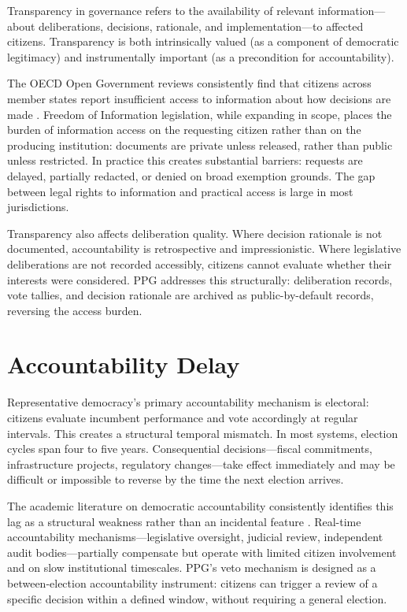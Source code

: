 \documentclass[12pt,a4paper,oneside]{report}
\begin{document}
Transparency in governance refers to the availability of relevant information---about deliberations, decisions, rationale, and implementation---to affected citizens. Transparency is both intrinsically valued (as a component of democratic legitimacy) and instrumentally important (as a precondition for accountability).

The OECD Open Government reviews consistently find that citizens across member states report insufficient access to information about how decisions are made \citep{oecd2020open}. Freedom of Information legislation, while expanding in scope, places the burden of information access on the requesting citizen rather than on the producing institution: documents are private unless released, rather than public unless restricted. In practice this creates substantial barriers: requests are delayed, partially redacted, or denied on broad exemption grounds. The gap between legal rights to information and practical access is large in most jurisdictions.

Transparency also affects deliberation quality. Where decision rationale is not documented, accountability is retrospective and impressionistic. Where legislative deliberations are not recorded accessibly, citizens cannot evaluate whether their interests were considered. PPG addresses this structurally: deliberation records, vote tallies, and decision rationale are archived as public-by-default records, reversing the access burden.

\section{Accountability Delay}

Representative democracy's primary accountability mechanism is electoral: citizens evaluate incumbent performance and vote accordingly at regular intervals. This creates a structural temporal mismatch. In most systems, election cycles span four to five years. Consequential decisions---fiscal commitments, infrastructure projects, regulatory changes---take effect immediately and may be difficult or impossible to reverse by the time the next election arrives.

The academic literature on democratic accountability consistently identifies this lag as a structural weakness rather than an incidental feature \citep{norris2011democratic}. Real-time accountability mechanisms---legislative oversight, judicial review, independent audit bodies---partially compensate but operate with limited citizen involvement and on slow institutional timescales. PPG's veto mechanism is designed as a between-election accountability instrument: citizens can trigger a review of a specific decision within a defined window, without requiring a general election.
\end{document}
